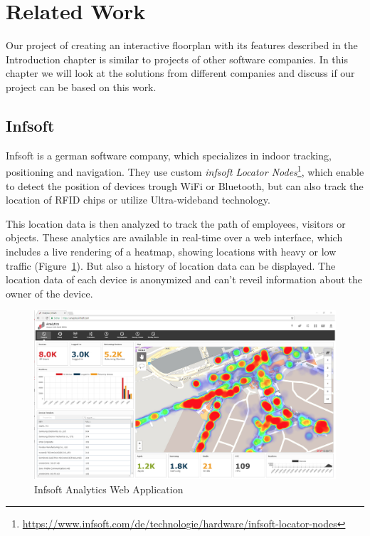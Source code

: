 \section{Related Work}

Our project of creating an interactive floorplan with its features described in the Introduction chapter is similar to projects of other software companies. In this chapter we will look at the solutions from different companies and discuss if our project can be based on this work.

\subsection{Infsoft}

Infsoft is a german software company, which specializes in indoor tracking, positioning and navigation. They use custom \emph{infsoft Locator Nodes}\footnote{\url{https://www.infsoft.com/de/technologie/hardware/infsoft-locator-nodes}}, which enable to detect the position of devices trough WiFi or Bluetooth, but can also track the location of RFID chips or utilize Ultra-wideband technology.

This location data is then analyzed to track the path of employees, visitors or objects. These analytics are available in real-time over a web interface, which includes a live rendering of a heatmap, showing locations with heavy or low traffic (Figure~\ref{fig:InfsoftApplication}). But also a history of location data can be displayed. The location data of each device is anonymized and can't reveil information about the owner of the device. 

\begin{figure}[!hb]
	\centering
	\includegraphics[width=0.9\linewidth]{images/Infsoft}
	\caption{Infsoft Analytics Web Application}
	\label{fig:InfsoftApplication}
\end{figure}

